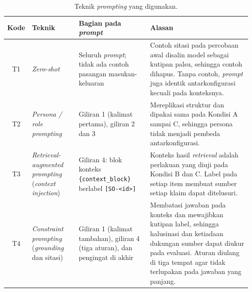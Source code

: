\begin{table}[!htbp]
\centering
\small
\caption{Teknik \emph{prompting} yang digunakan.}
\label{tab:teknik-prompt}
\renewcommand{\arraystretch}{1.2}
\begin{tabularx}{\textwidth}{|c|>{\raggedright\arraybackslash}p{3.2cm}|>{\raggedright\arraybackslash}p{3.6cm}|>{\raggedright\arraybackslash}X|}
\hline
\textbf{Kode} & \textbf{Teknik} & \textbf{Bagian pada \emph{prompt}} & \textbf{Alasan} \\
\hline
T1 & \emph{Zero-shot} & Seluruh \emph{prompt}; tidak ada contoh pasangan masukan-keluaran & Contoh sitasi pada percobaan awal disalin model sebagai kutipan palsu, sehingga contoh dihapus. Tanpa contoh, \emph{prompt} juga identik antarkonfigurasi kecuali pada konteksnya. \\
\hline
T2 & \emph{Persona / role prompting} & Giliran 1 (kalimat pertama), giliran 2 dan 3 & Mereplikasi struktur \textcite{DaSilva2025} dan dipakai sama pada Kondisi A sampai C, sehingga persona tidak menjadi pembeda antarkonfigurasi. \\
\hline
T3 & \emph{Retrieval-augmented prompting} (\emph{context injection}) & Giliran 4: blok konteks \texttt{\{context\_block\}} berlabel \texttt{[SO-<id>]} & Konteks hasil \emph{retrieval} adalah perlakuan yang diuji pada Kondisi B dan C. Label pada setiap item membuat sumber setiap klaim dapat ditelusuri. \\
\hline
T4 & \emph{Constraint prompting} (\emph{grounding} dan sitasi) & Giliran 1 (kalimat tambahan), giliran 4 (tiga aturan), dan pengingat di akhir & Membatasi jawaban pada konteks dan mewajibkan kutipan label, sehingga halusinasi dan ketiadaan dukungan sumber dapat diukur pada evaluasi. Aturan diulang di tiga tempat agar tidak terlupakan pada jawaban yang panjang. \\
\hline
\end{tabularx}
\end{table}

